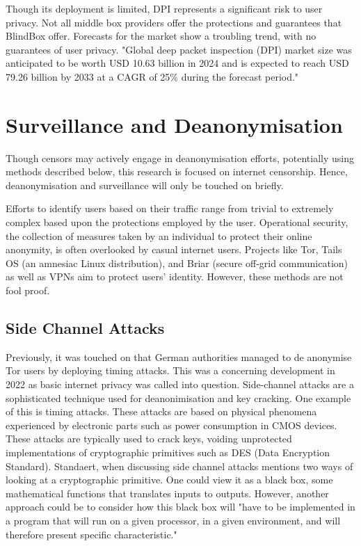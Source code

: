Though its deployment is limited, DPI represents a significant risk to user privacy. Not all middle box providers offer the protections and guarantees that BlindBox offer. Forecasts for the market show a troubling trend, with no guarantees of user privacy. "Global deep packet inspection (DPI) market size was anticipated to be worth USD 10.63 billion in 2024 and is expected to reach USD 79.26 billion by 2033 at a CAGR of 25\% during the forecast period." \cite{DPIMarketInfo}




\section{Surveillance and Deanonymisation}

Though censors may actively engage in deanonymisation efforts, potentially using methods described below, this research is focused on internet censorship. Hence, deanonymisation and surveillance will only be touched on briefly.

Efforts to identify users based on their traffic range from trivial to extremely complex based upon the protections employed by the user. Operational security, the collection of measures taken by an individual to protect their online anonymity, is often overlooked by casual internet users. Projects like Tor, Tails OS (an amnesiac Linux distribution), and Briar (secure off-grid communication) as well as VPNs aim to protect users’ identity. However, these methods are not fool proof. 

\subsection{Side Channel Attacks}
Previously, it was touched on that German authorities managed to de anonymise Tor users by deploying timing attacks. This was a concerning development in 2022 as basic internet privacy was called into question. Side-channel attacks are a sophisticated technique used for deanonimisation and key cracking. One example of this is timing attacks. These attacks are based on physical phenomena experienced by electronic parts such as power consumption in CMOS devices. These attacks are typically used to crack keys, voiding unprotected implementations of cryptographic primitives such as DES (Data Encryption Standard). Standaert, when discussing side channel attacks mentions two ways of looking at a cryptographic primitive. One could view it as a black box, some mathematical functions that translates inputs to outputs. However, another approach could be to consider how this black box will "have to be implemented in a program that will run on a given processor, in a given environment, and will therefore present specific characteristic." \cite{standaert2005introduction} 

